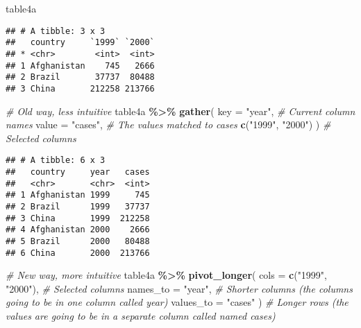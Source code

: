 \documentclass[
]{book}
\newenvironment{Shaded}{\begin{snugshade}}{\end{snugshade}}
\newcommand{\CommentTok}[1]{\textcolor[rgb]{0.56,0.35,0.01}{\textit{#1}}}
\newcommand{\DataTypeTok}[1]{\textcolor[rgb]{0.13,0.29,0.53}{#1}}
\newcommand{\KeywordTok}[1]{\textcolor[rgb]{0.13,0.29,0.53}{\textbf{#1}}}
\newcommand{\NormalTok}[1]{#1}
\newcommand{\OperatorTok}[1]{\textcolor[rgb]{0.81,0.36,0.00}{\textbf{#1}}}
\newcommand{\StringTok}[1]{\textcolor[rgb]{0.31,0.60,0.02}{#1}}
\begin{document}
\begin{Shaded}
\begin{Highlighting}[]
\NormalTok{table4a}
\end{Highlighting}
\end{Shaded}

\begin{verbatim}
## # A tibble: 3 x 3
##   country     `1999` `2000`
## * <chr>        <int>  <int>
## 1 Afghanistan    745   2666
## 2 Brazil       37737  80488
## 3 China       212258 213766
\end{verbatim}

\begin{Shaded}
\begin{Highlighting}[]
\CommentTok{\# Old way, less intuitive}
\NormalTok{table4a }\OperatorTok{\%\textgreater{}\%}
\StringTok{  }\KeywordTok{gather}\NormalTok{(}
    \DataTypeTok{key =} \StringTok{"year"}\NormalTok{, }\CommentTok{\# Current column names}
    \DataTypeTok{value =} \StringTok{"cases"}\NormalTok{, }\CommentTok{\# The values matched to cases}
    \KeywordTok{c}\NormalTok{(}\StringTok{"1999"}\NormalTok{, }\StringTok{"2000"}\NormalTok{)}
\NormalTok{  ) }\CommentTok{\# Selected columns}
\end{Highlighting}
\end{Shaded}

\begin{verbatim}
## # A tibble: 6 x 3
##   country     year   cases
##   <chr>       <chr>  <int>
## 1 Afghanistan 1999     745
## 2 Brazil      1999   37737
## 3 China       1999  212258
## 4 Afghanistan 2000    2666
## 5 Brazil      2000   80488
## 6 China       2000  213766
\end{verbatim}

\begin{Shaded}
\begin{Highlighting}[]
\CommentTok{\# New way, more intuitive}
\NormalTok{table4a }\OperatorTok{\%\textgreater{}\%}
\StringTok{  }\KeywordTok{pivot\_longer}\NormalTok{(}
    \DataTypeTok{cols =} \KeywordTok{c}\NormalTok{(}\StringTok{"1999"}\NormalTok{, }\StringTok{"2000"}\NormalTok{), }\CommentTok{\# Selected columns}
    \DataTypeTok{names\_to =} \StringTok{"year"}\NormalTok{, }\CommentTok{\# Shorter columns (the columns going to be in one column called year)}
    \DataTypeTok{values\_to =} \StringTok{"cases"}
\NormalTok{  ) }\CommentTok{\# Longer rows (the values are going to be in a separate column called named cases)}
\end{Highlighting}
\end{Shaded}
\end{document}
